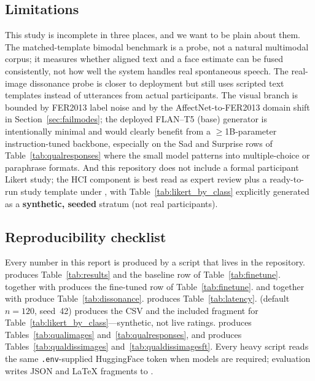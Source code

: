 \documentclass[sigconf,nonacm]{acmart}
\begin{document}
\subsection{Limitations}
This study is incomplete in three places, and we want to be plain about them. The matched-template bimodal benchmark is a probe, not a natural multimodal corpus; it measures whether aligned text and a face estimate can be fused consistently, not how well the system handles real spontaneous speech. The real-image dissonance probe is closer to deployment but still uses scripted text templates instead of utterances from actual participants. The visual branch is bounded by FER2013 label noise and by the AffectNet-to-FER2013 domain shift in Section~\ref{sec:failmodes}; the deployed FLAN--T5 (base) generator is intentionally minimal and would clearly benefit from a $\geq$1B-parameter instruction-tuned backbone, especially on the Sad and Surprise rows of Table~\ref{tab:qualresponses} where the small model patterns into multiple-choice or paraphrase formats. And this repository does not include a formal participant Likert study; the HCI component is best read as expert review plus a ready-to-run study template under , with Table~\ref{tab:likert_by_class} explicitly generated as a \textbf{synthetic, seeded} stratum (not real participants).

\subsection{Reproducibility checklist}
Every number in this report is produced by a script that lives in the repository.  produces Table~\ref{tab:results} and the baseline row of Table~\ref{tab:finetune}.  together with  produces the fine-tuned row of Table~\ref{tab:finetune}.  and  together with  produce Table~\ref{tab:dissonance}.  produces Table~\ref{tab:latency}.  (default $n\!=\!120$, seed~42) produces the CSV and the included fragment for Table~\ref{tab:likert_by_class}---synthetic, not live ratings.  produces Tables~\ref{tab:qualimages} and~\ref{tab:qualresponses}, and  produces Tables~\ref{tab:qualdissimages} and~\ref{tab:qualdissimagesft}. Every heavy script reads the same \texttt{.env}-supplied HuggingFace token when models are required; evaluation writes JSON and LaTeX fragments to .
\end{document}
